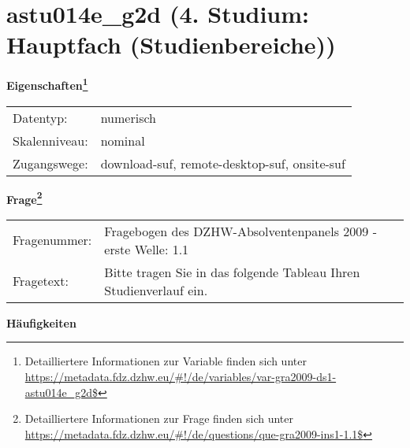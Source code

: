 
    \setcounter{footnote}{0}

    \vspace*{-1.8cm}
	\section{astu014e\_g2d (4. Studium: Hauptfach (Studienbereiche))}
	\label{section:astu014e_g2d}



    \vspace*{0.5cm}
    \noindent\textbf{Eigenschaften\footnote{Detailliertere Informationen zur Variable finden sich unter
		\url{https://metadata.fdz.dzhw.eu/\#!/de/variables/var-gra2009-ds1-astu014e_g2d$}}}\\
	\begin{tabularx}{\hsize}{@{}lX}
	Datentyp: & numerisch \\
	Skalenniveau: & nominal \\
	Zugangswege: &
	  download-suf, 
	  remote-desktop-suf, 
	  onsite-suf
 \\
    \end{tabularx}



				\vspace*{0.5cm}
                \noindent\textbf{Frage\footnote{Detailliertere Informationen zur Frage finden sich unter
		              \url{https://metadata.fdz.dzhw.eu/\#!/de/questions/que-gra2009-ins1-1.1$}}}\\
				\begin{tabularx}{\hsize}{@{}lX}
					Fragenummer: &
					  Fragebogen des DZHW-Absolventenpanels 2009 - erste Welle:
					  1.1
 \\
					Fragetext: & Bitte tragen Sie in das folgende Tableau Ihren Studienverlauf ein. \\
				\end{tabularx}





        		\vspace*{0.5cm}
                \noindent\textbf{Häufigkeiten}

